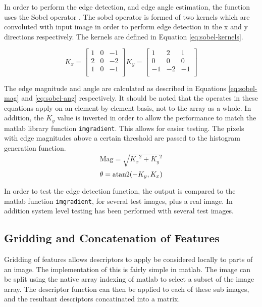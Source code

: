 In order to perform the edge detection, and edge angle estimation, the function uses the Sobel operator \cite{sobel2015}. The sobel operator is formed of two kernels which are convoluted with input image in order to perform edge detection in the x and y directions respectively. The kernels are defined in Equation \ref{eq:sobel-kernels}. 

\begin{equation}
	K_x = 
	\begin{bmatrix}
	1 & 0 & -1 \\
	2 & 0 & -2 \\
	1 & 0 & -1 \\
	\end{bmatrix}
	K_y = 
	\begin{bmatrix}
	1 & 2 & 1 \\
	0 & 0 & 0 \\
	-1 & -2 & -1 \\
	\end{bmatrix}
	\label{eq:sobel-kernels}
\end{equation}

The edge magnitude and angle are calculated as described in Equations \ref{eq:sobel-mag} and \ref{eq:sobel-ang} respectively. It should be noted that the operates in these equations apply on an element-by-element basis, not to the array as a whole. In addition, the $K_y$ value is inverted in order to allow the performance to match the \gls{matlab} library function \texttt{imgradient}. This allows for easier testing. The pixels with edge magnitudes above a certain threshold are passed to the histogram generation function.
\begin{equation}
\text{Mag} = \sqrt{{K_x}^2 + {K_y}^2}
\label{eq:sobel-mag}
\end{equation}
\begin{equation}
\theta = \operatorname{atan2}(-K_y, K_x)
\label{eq:sobel-ang}
\end{equation}

In order to test the edge detection function, the output is compared to the \gls{matlab} function \texttt{imgradient}, for several test images, plus a real image. In addition system level testing has been performed with several test images.
\subsection{Gridding and Concatenation of Features} \label{sec:gridding-concatenation}
Gridding of features allows descriptors to apply be considered locally to parts of an image. The implementation of this is fairly simple in \gls{matlab}. The image can be split using the native array indexing of \gls{matlab} to select a subset of the image array. The descriptor function can then be applied to each of these sub images, and the resultant descriptors concatinated into a matrix.

